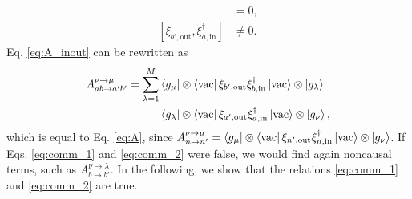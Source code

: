 \documentclass[notitlepage, prx, preprint, amsmath,superscriptaddress,amssymb]{revtex4-1}
\begin{document}
\begin{align}
[\xi_{a',\text{out}},\xi_{b,\text{in}}^\dagger]&=0, \label{eq:comm_1} \\
[\xi_{b',\text{out}},\xi_{a,\text{in}}^\dagger]&\neq 0. \label{eq:comm_2}
\end{align}
Eq. \eqref{eq:A_inout} can be rewritten as
\begin{align}
A_{ab\to a'b'}^{\nu\to\mu}=\sum_{\lambda=1}^M&\bra{g_\mu}\otimes\bra{\text{vac}}\xi_{b',\text{out}}\xi_{b,\text{in}}^\dagger \ket{\text{vac}}\otimes\ket{g_\lambda}\nonumber\\
&\bra{g_\lambda} \otimes \bra{\text{vac}} \xi_{a',\text{out}} \xi_{a,\text{in}}^\dagger
\ket{\text{vac}}\otimes\ket{g_\nu},
\end{align}
which is equal to Eq. \eqref{eq:A}, since $A_{n\to n'}^{\nu\to\mu}=\bra{g_\mu}\otimes\bra{\text{vac}}\xi_{n',\text{out}}\xi_{n,\text{in}}^\dagger \ket{\text{vac}}\otimes\ket{g_\nu}$. If Eqs. \eqref{eq:comm_1} and \eqref{eq:comm_2} were false, we would find again noncausal terms, such as $A_{b\to b'}^{\nu\to\lambda}$. In the following, we show that the relations \eqref{eq:comm_1} and \eqref{eq:comm_2} are true.
\end{document}
